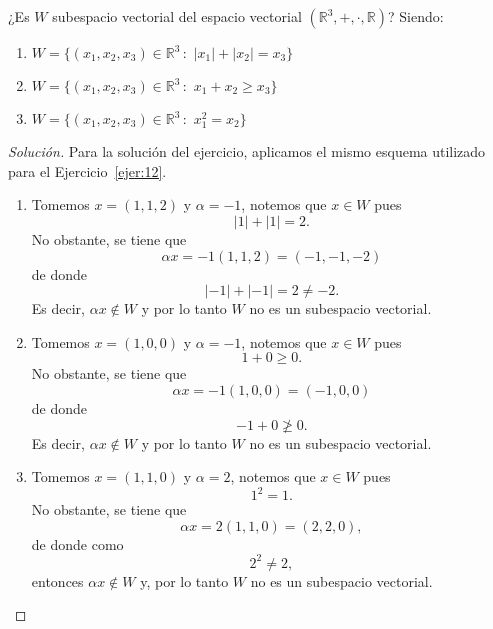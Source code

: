 \documentclass[a4,11pt]{aleph-notas}
\begin{document}
\begin{ejer}
    ¿Es $W$ subespacio vectorial del espacio vectorial $(\mathbb{R}^3, + , \cdot, \mathbb{R})$? Siendo:
\begin{enumerate}
\item $W = \{(x_1, x_2, x_3) \in \mathbb{R}^3 \,:\, \, |x_1| + |x_2| = x_3\}$
\item $W = \{(x_1, x_2, x_3) \in \mathbb{R}^3 \,:\, \, x_1 + x_2 \geq x_3\}$
\item $W = \{(x_1, x_2, x_3) \in \mathbb{R}^3 \,:\, \, x_1^2 = x_2 \}$
\end{enumerate}
\end{ejer}

\begin{proof}[Solución]\hspace{0pt}
    Para la solución del ejercicio, aplicamos el mismo esquema utilizado para el Ejercicio~\ref{ejer:12}.

    \begin{enumerate}
        \item Tomemos $x=(1,1,2)$ y $\alpha=-1$, notemos que $x\in W$ pues 
        \[
            |1|+|1| = 2.
        \]
        No obstante, se tiene que 
        \[
            \alpha x = -1(1,1,2) = (-1,-1,-2)
        \]
        de donde
        \[
            |-1|+|-1| = 2 \neq -2.
        \]
        Es decir, $\alpha x\notin W$ y por lo tanto $W$ no es un subespacio vectorial.
        
        \item Tomemos $x=(1,0,0)$ y $\alpha = -1$, notemos que $x\in W$ pues 
        \[
            1 + 0 \geq 0.
        \]
        No obstante, se tiene que 
        \[
            \alpha x = -1 (1,0,0) = (-1,0,0)
        \]
        de donde
        \[
            -1 + 0 \not\geq 0.
        \]
        Es decir, $\alpha x\notin W$ y por lo tanto $W$ no es un subespacio vectorial.
    \item 
        Tomemos $x=(1,1,0)$ y $\alpha=2$, notemos que $x\in W$ pues   
        \[
            1^2 = 1.
        \]
        No obstante, se tiene que 
        \[
            \alpha x = 2(1,1,0) = (2,2,0),
        \]
        de donde como 
        \[
            2^2 \neq 2,
        \]
        entonces $\alpha x\notin W$ y, por lo tanto $W$ no es un subespacio vectorial. \qedhere
    \end{enumerate}

\end{proof}
\end{document}
